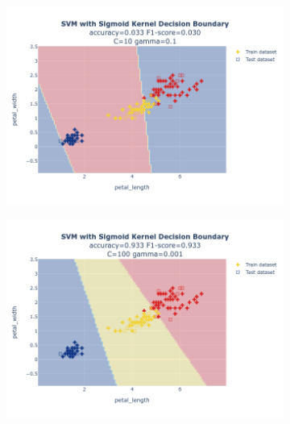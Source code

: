 \documentclass{article}
\begin{document}
\begin{figure}
\begin{subfigure}{0.3\textwidth}
        \includegraphics[scale=.13]{images/implementation/q1/sigmoid_kernel/petal_length_petal_width_10_0.1.png}
    \end{subfigure}
    \newline
    \begin{subfigure}{0.3\textwidth}
        \centering
        \includegraphics[scale=.13]{images/implementation/q1/sigmoid_kernel/petal_length_petal_width_100_0.001.png}
    \end{subfigure}
    \hfill
    \begin{subfigure}{0.3\textwidth}
        \centering

\end{subfigure}
\end{figure}
\end{document}
